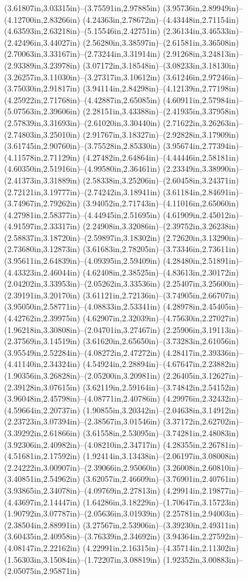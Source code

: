 (3.61807in,3.03315in)--(3.75591in,2.97885in) (3.95736in,2.89949in)--(4.12700in,2.83266in) (4.24363in,2.78672in)--(4.43448in,2.71154in) (4.63593in,2.63218in)--(5.15546in,2.42751in) (2.36134in,3.46533in)--(2.42496in,3.44027in) (2.56280in,3.38597in)--(2.61581in,3.36508in) (2.70063in,3.33167in)--(2.73244in,3.31914in) (2.91268in,3.24813in)--(2.93389in,3.23978in) (3.07172in,3.18548in)--(3.08233in,3.18130in) (3.26257in,3.11030in)--(3.27317in,3.10612in) (3.61246in,2.97246in)--(3.75030in,2.91817in) (3.94114in,2.84298in)--(4.12139in,2.77198in) (4.25922in,2.71768in)--(4.42887in,2.65085in) (4.60911in,2.57984in)--(5.07563in,2.39606in) (2.28151in,3.43388in)--(2.41935in,3.37958in) (2.57839in,3.31693in)--(2.61020in,3.30440in) (2.71622in,3.26263in)--(2.74803in,3.25010in) (2.91767in,3.18327in)--(2.92828in,3.17909in) (3.61745in,2.90760in)--(3.75528in,2.85330in) (3.95674in,2.77394in)--(4.11578in,2.71129in) (4.27482in,2.64864in)--(4.44446in,2.58181in) (4.60350in,2.51916in)--(4.99580in,2.36461in) (2.23349in,3.38990in)--(2.41373in,3.31889in) (2.58338in,3.25206in)--(2.60458in,3.24371in) (2.72121in,3.19777in)--(2.74242in,3.18941in) (3.61184in,2.84691in)--(3.74967in,2.79262in) (3.94052in,2.71743in)--(4.11016in,2.65060in) (4.27981in,2.58377in)--(4.44945in,2.51695in) (4.61909in,2.45012in)--(4.91597in,2.33317in) (2.24908in,3.32086in)--(2.39752in,3.26238in) (2.58837in,3.18720in)--(2.59897in,3.18302in) (2.72620in,3.13290in)--(2.73680in,3.12873in) (3.61683in,2.78205in)--(3.73346in,2.73611in) (3.95611in,2.64839in)--(4.09395in,2.59409in) (4.28480in,2.51891in)--(4.43323in,2.46044in) (4.62408in,2.38525in)--(4.83613in,2.30172in) (2.04202in,3.33953in)--(2.05262in,3.33536in) (2.25407in,3.25600in)--(2.39191in,3.20170in) (3.61121in,2.72136in)--(3.74905in,2.66707in) (3.95050in,2.58771in)--(4.08833in,2.53341in) (4.28978in,2.45405in)--(4.42762in,2.39975in) (4.62907in,2.32039in)--(4.75630in,2.27027in) (1.96218in,3.30808in)--(2.04701in,3.27467in) (2.25906in,3.19113in)--(2.37569in,3.14519in) (3.61620in,2.65650in)--(3.73283in,2.61056in) (3.95549in,2.52284in)--(4.08272in,2.47272in) (4.28417in,2.39336in)--(4.41140in,2.34324in) (4.54924in,2.28894in)--(4.67647in,2.23882in) (1.90356in,3.26828in)--(2.05200in,3.20981in) (2.26405in,3.12627in)--(2.39128in,3.07615in) (3.62119in,2.59164in)--(3.74842in,2.54152in) (3.96048in,2.45798in)--(4.08771in,2.40786in) (4.29976in,2.32432in)--(4.59664in,2.20737in) (1.90855in,3.20342in)--(2.04638in,3.14912in) (2.23723in,3.07394in)--(2.38567in,3.01546in) (3.37172in,2.62702in)--(3.39292in,2.61866in) (3.61558in,2.53095in)--(3.74281in,2.48083in) (3.92306in,2.40982in)--(4.08210in,2.34717in) (4.28355in,2.26781in)--(4.51681in,2.17592in) (1.92414in,3.13438in)--(2.06197in,3.08008in) (2.24222in,3.00907in)--(2.39066in,2.95060in) (3.26008in,2.60810in)--(3.40851in,2.54962in) (3.62057in,2.46609in)--(3.76901in,2.40761in) (3.93865in,2.34078in)--(4.09769in,2.27813in) (4.29914in,2.19877in)--(4.43697in,2.14447in) (1.64286in,3.18229in)--(1.70647in,3.15723in) (1.90792in,3.07787in)--(2.05636in,3.01939in) (2.25781in,2.94003in)--(2.38504in,2.88991in) (3.27567in,2.53906in)--(3.39230in,2.49311in) (3.60435in,2.40958in)--(3.76339in,2.34692in) (3.94364in,2.27592in)--(4.08147in,2.22162in) (4.22991in,2.16315in)--(4.35714in,2.11302in) (1.56303in,3.15084in)--(1.72207in,3.08819in) (1.92352in,3.00883in)--(2.05075in,2.95871in) 